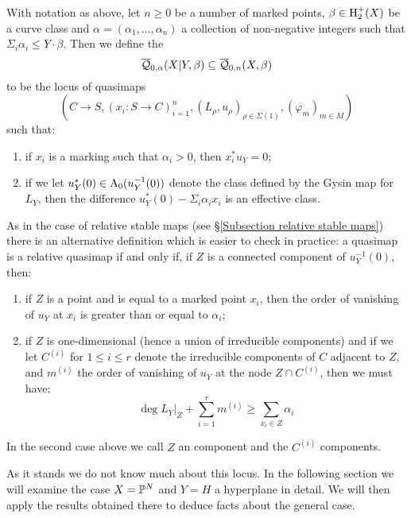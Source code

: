 \begin{definition} With notation as above, let $n \geq 0$ be a number of marked points, $\beta \in \operatorname{H}_2^+(X)$ be a curve class and $\alpha=(\alpha_1, \ldots, \alpha_n)$ a collection of non-negative integers such that $\Sigma_i \alpha_i \leq Y \cdot \beta$. Then we define the 
\begin{equation*} \overline{\mathcal Q}_{0,\alpha}(X|Y,\beta) \subseteq \overline{\mathcal Q}_{0,n}(X,\beta) \end{equation*}
to be the locus of quasimaps
\begin{equation*} (C \to S, (x_i : S \to C)_{i=1}^n, (L_\rho,u_\rho)_{\rho \in \Sigma(1)}, (\varphi_m)_{m \in M}) \end{equation*}
such that:
\begin{enumerate}
\item if $x_i$ is a marking such that $\alpha_i > 0$, then $x_i^* u_Y = 0$;
\item if we let $u_Y^*(0) \in \operatorname{A}_0(u_Y^{-1}(0))$ denote the class defined by the Gysin map for $L_Y$, then the difference $u_Y^*(0) - \Sigma_i \alpha_i x_i$ is an effective class.
\end{enumerate}
\end{definition}

\begin{remark} As in the case of relative stable maps (see \S \ref{Subsection relative stable maps}) there is an alternative definition which is easier to check in practice: a quasimap is a relative quasimap if and only if, if $Z$ is a connected component of $u_Y^{-1}(0)$, then:
\begin{enumerate}
\item if $Z$ is a point and is equal to a marked point $x_i$, then the order of vanishing of $u_Y$ at $x_i$ is greater than or equal to $\alpha_i$;
\item if $Z$ is one-dimensional (hence a union of irreducible components) and if we let $C^{(i)}$ for $1 \leq i \leq r$ denote the irreducible components of $C$ adjacent to $Z$, and $m^{(i)}$ the order of vanishing of $u_Y$ at the node $Z \cap C^{(i)}$, then we must have:
\begin{equation} \label{Relative quasimap internal component inequality} \deg L_Y|_Z + \sum_{i=1}^r m^{(i)} \geq \sum_{x_i \in Z} \alpha_i \end{equation}
\end{enumerate}
\end{remark}

\begin{remark}In the second case above we call $Z$ an  component and the $C^{(i)}$  components.\end{remark}

As it stands we do not know much about this locus. In the following section we will examine the case $X=\mathbb P^N$ and $Y=H$ a hyperplane in detail. We will then apply the results obtained there to deduce facts about the general case.